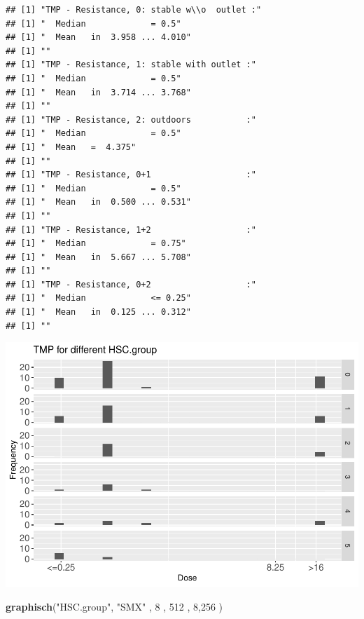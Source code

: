 \documentclass[
]{article}
\newenvironment{Shaded}{\begin{snugshade}}{\end{snugshade}}
\newcommand{\DecValTok}[1]{\textcolor[rgb]{0.00,0.00,0.81}{#1}}
\newcommand{\KeywordTok}[1]{\textcolor[rgb]{0.13,0.29,0.53}{\textbf{#1}}}
\newcommand{\NormalTok}[1]{#1}
\newcommand{\StringTok}[1]{\textcolor[rgb]{0.31,0.60,0.02}{#1}}
\begin{document}
\begin{verbatim}
## [1] "TMP - Resistance, 0: stable w\\o  outlet :"
## [1] "  Median             = 0.5"
## [1] "  Mean   in  3.958 ... 4.010"
## [1] ""
## [1] "TMP - Resistance, 1: stable with outlet :"
## [1] "  Median             = 0.5"
## [1] "  Mean   in  3.714 ... 3.768"
## [1] ""
## [1] "TMP - Resistance, 2: outdoors           :"
## [1] "  Median             = 0.5"
## [1] "  Mean   =  4.375"
## [1] ""
## [1] "TMP - Resistance, 0+1                   :"
## [1] "  Median             = 0.5"
## [1] "  Mean   in  0.500 ... 0.531"
## [1] ""
## [1] "TMP - Resistance, 1+2                   :"
## [1] "  Median             = 0.75"
## [1] "  Mean   in  5.667 ... 5.708"
## [1] ""
## [1] "TMP - Resistance, 0+2                   :"
## [1] "  Median             <= 0.25"
## [1] "  Mean   in  0.125 ... 0.312"
## [1] ""
\end{verbatim}

\includegraphics{Verteilungen_files/figure-latex/unnamed-chunk-55-1.pdf}

\begin{Shaded}
\begin{Highlighting}[]
  \KeywordTok{graphisch}\NormalTok{(}\StringTok{"HSC.group"}\NormalTok{, }\StringTok{"SMX"}\NormalTok{ , }\DecValTok{8}\NormalTok{    , }\DecValTok{512}\NormalTok{   ,   }\DecValTok{8}\NormalTok{,}\DecValTok{256}\NormalTok{    ) }
\end{Highlighting}
\end{Shaded}
\end{document}
